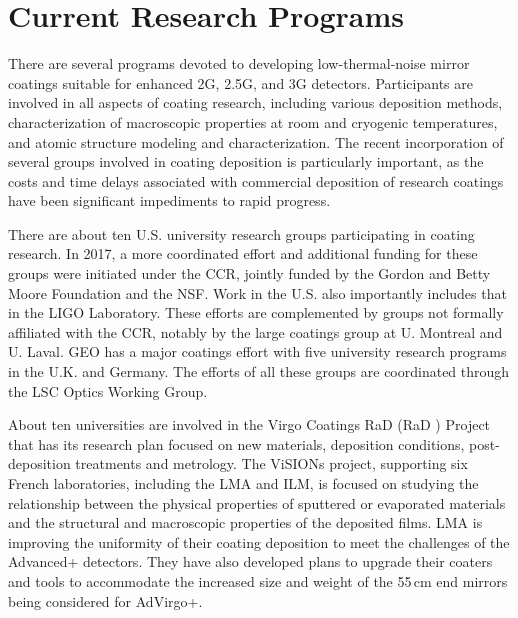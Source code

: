 \section{Current Research Programs}

There are several 
programs devoted to developing low-thermal-noise mirror coatings suitable for enhanced \ac{2G}, \ac{2.5G}, and \ac{3G} detectors. Participants are involved in all aspects of coating research, including various deposition methods, characterization of macroscopic properties at room and cryogenic temperatures, and atomic structure modeling and characterization. The recent incorporation 
of several groups involved in coating deposition is particularly important, as the costs and time delays associated with commercial deposition of research coatings have been significant impediments to rapid progress.

There are about ten U.S. university research groups participating in 
coating research. In 2017, a more coordinated effort and additional funding for these groups were initiated under the \ac{CCR}, jointly funded by the Gordon and Betty Moore Foundation and the NSF. Work in the U.S. also importantly includes that in the \ac{LIGO} Laboratory. These efforts are complemented by groups not formally affiliated with the \ac{CCR}, notably by the large coatings group at U. Montreal and U. Laval. \ac{GEO} has a major coatings effort with five university research programs in the \acs*{U.K.} and Germany. 
The efforts of all these groups are coordinated through 
the \ac{LSC} Optics Working Group.

About ten universities are involved in the Virgo Coatings \ac{RaD}   (\ac{RaD}  ) Project that has its research plan focused on new materials, deposition conditions, post-deposition treatments and metrology. The \acs*{ViSIONs} project, supporting six French laboratories, including the \ac{LMA} and \ac{ILM}, is focused on studying the relationship between the physical properties of sputtered or evaporated materials and the structural and macroscopic properties of the deposited films. 
\ac{LMA} is improving the uniformity of their coating deposition to meet the challenges of the Advanced+ detectors. They have also developed plans to upgrade their coaters and tools to accommodate the increased size and weight of the 55\,cm end mirrors being considered for \ac{AdVirgo+}.

